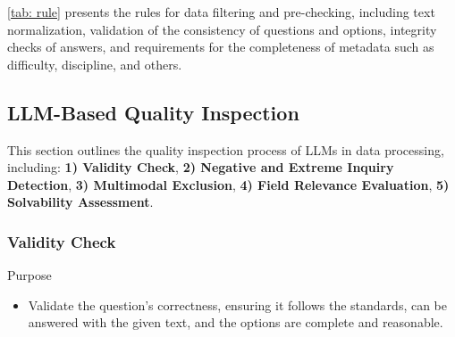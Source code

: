 \autoref{tab: rule} presents the rules for data filtering and pre-checking, including text normalization, validation of the consistency of questions and options, integrity checks of answers, and requirements for the completeness of metadata such as difficulty, discipline, and others.

\newpage
\subsection{LLM-Based Quality Inspection}

This section outlines the quality inspection process of LLMs in data processing, including:
\textbf{1) Validity Check},
\textbf{2) Negative and Extreme Inquiry Detection}, 
\textbf{3) Multimodal Exclusion},  
\textbf{4) Field Relevance Evaluation},  
\textbf{5) Solvability Assessment}.


\label{Appendix: LLM-Based Screening}
\subsubsection{Validity Check}

\begin{purposebox}{Purpose}
\begin{itemize}
    \item Validate the question's correctness, ensuring it follows the standards, can be answered with the given text, and the options are complete and reasonable.
\end{itemize}
\end{purposebox}

